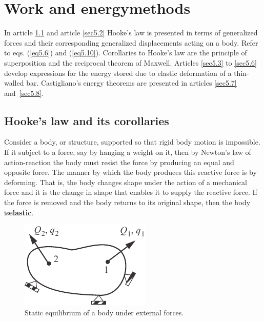 \documentclass{AeroStructure-ERJohnson}
\begin{document}
\mainmatter

\setcounter{page}{121}


\setcounter{chapter}{4}

\chapter[Work and energy methods]{Work and energy\break methods}\label{chap05}

In article \ref{sec5.1} and article \ref{sec5.2} Hooke's law is presented in terms of generalized forces and their corresponding generalized displacements acting on a body. Refer to eqs. (\ref{eq5.6}) and (\ref{eq5.10}). Corollaries to Hooke's law are the principle of superposition and the reciprocal theorem of Maxwell. Articles \ref{sec5.3} to \ref{sec5.6} develop expressions for the energy stored due to elastic deformation of a thin-walled bar. Castigliano's energy theorems are presented in articles \ref{sec5.7} and~\ref{sec5.8}.

\section{Hooke's law and its corollaries}\label{sec5.1}

Consider a body, or structure, supported so that rigid body motion is impossible. If it subject to a force, say by hanging a weight on it, then by Newton's law of action-reaction the body must resist the force by producing an equal and opposite force. The manner by which the body produces this reactive force is by deforming. That is, the body changes shape under the action of a mechanical force and it is the change in shape that enables it to supply the reactive force. If the force is removed and the body returns to its original shape, then the body is\break \textbf{elastic}.

\begin{figure}
\vspace{-17pt}
\includegraphics{Figure_5-1.pdf}
\caption{Static equilibrium of a body under external forces.\label{fig5.1}}
\end{figure}
\end{document}
